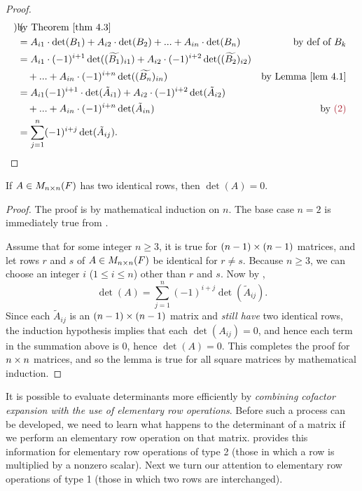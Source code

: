\begin{proof}
\begin{align*}
\begin{pmatrix}
                \end{pmatrix} & \text{by \THM{4.3}} \\
            & = A_{i1} \cdot \det(B_1) + A_{i2} \cdot \det(B_2) + ... + A_{in} \cdot \det(B_n) & \text{by def of \(B_k\)} \\
            & = A_{i1} \cdot (-1)^{i + 1} \det((\widetilde{B_1})_{i1}) + A_{i2} \cdot (-1)^{i + 2} \det((\widetilde{B_2})_{i2}) \\
            & \quad + ... + A_{in} \cdot (-1)^{i + n} \det((\widetilde{B_n})_{in}) & \text{by \LEM{4.1}} \\
            & = A_{i1} (-1)^{i + 1} \cdot \det(\tilde{A}_{i1}) + A_{i2} \cdot (-1)^{i + 2} \det(\tilde{A}_{i2}) \\
            & \quad + ... + A_{in} \cdot (-1)^{i + n} \det(\tilde{A}_{in}) & \text{by \MAROON{(2)}} \\
            & = \sum_{j = 1}^n (-1)^{i + j} \det(\tilde{A}_{ij}).
\end{align*}
\end{proof}

\begin{corollary} \label{corollary 4.4.1}
If \(A \in M_{n \times n}(F)\) has two identical rows, then \(\det(A) = 0\).
\end{corollary}

\begin{proof}
The proof is by mathematical induction on \(n\).
The base case \(n = 2\) is immediately true from .

Assume that for some integer \(n \ge 3\), it is true for \((n - 1) \times (n - 1)\) matrices, and let rows \(r\) and \(s\) of \(A \in M_{n \times n}(F)\) be identical for \(r \ne s\).
Because \(n \ge 3\), we can choose an integer \(i\) (\(1 \le i \le n\)) other than \(r\) and \(s\).
Now by ,
\[
    \det(A) = \sum_{j = 1}^n (-1)^{i + j} \det(\tilde{A}_{ij}).
\]
Since each \(\tilde{A}_{ij}\) is an \((n - 1) \times (n - 1)\) matrix and \emph{still have} two identical rows, the induction hypothesis implies that each \(\det(A_{ij}) = 0\), and hence each term in the summation above is \(0\), hence \(\det(A) = 0\).
This completes the proof for \(n \times n\) matrices, and so the lemma is true for all square matrices by mathematical induction.
\end{proof}

It is possible to evaluate determinants more efficiently by \emph{combining cofactor expansion with the use of elementary row operations}.
Before such a process can be developed, we need to learn what happens to the determinant of a matrix if we perform an elementary row operation on that matrix.
 provides this information for elementary row operations of type 2 (those in which a row is multiplied by a nonzero scalar).
Next we turn our attention to elementary row operations of type 1 (those in which two rows are interchanged).

